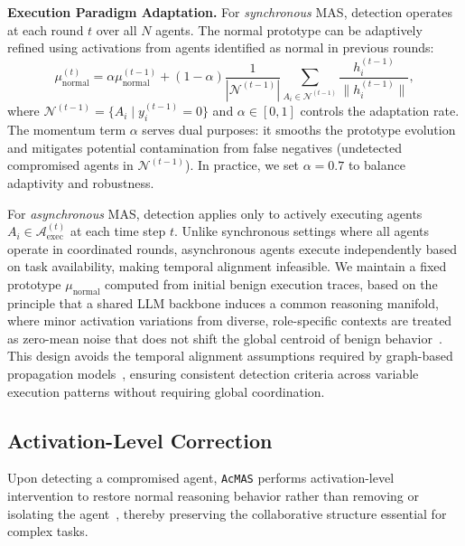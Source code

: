 \documentclass{article}
\newcommand{\app}{\texttt{AcMAS}}
\theoremstyle{plain}
\theoremstyle{definition}
\theoremstyle{remark}
\begin{document}
\noindent\textbf{Execution Paradigm Adaptation.}
For \textit{synchronous} MAS, detection operates at each round $t$ over all
$N$ agents. The normal prototype can be adaptively refined using activations
from agents identified as normal in previous rounds:
\begin{equation}
\mu_{\text{normal}}^{(t)} = \alpha \mu_{\text{normal}}^{(t-1)} +
(1-\alpha) \frac{1}{|\mathcal{N}^{(t-1)}|}
\sum_{A_i \in \mathcal{N}^{(t-1)}} \frac{h_i^{(t-1)}}{\|h_i^{(t-1)}\|},
\label{eq:adaptive_update}
\end{equation}
where $\mathcal{N}^{(t-1)} = \{A_i \mid y_i^{(t-1)} = 0\}$ and
$\alpha \in [0,1]$ controls the adaptation rate.
The momentum term $\alpha$ serves dual purposes: it smooths the prototype 
evolution and mitigates potential contamination from false negatives 
(undetected compromised agents in $\mathcal{N}^{(t-1)}$).
In practice, we set $\alpha = 0.7$ to balance adaptivity and robustness.

For \textit{asynchronous} MAS, detection applies only to actively executing
agents $A_i \in \mathcal{A}_{\text{exec}}^{(t)}$ at each time step $t$.
Unlike synchronous settings where all agents operate in coordinated rounds, 
asynchronous agents execute independently based on task availability, making 
temporal alignment infeasible.
We maintain a fixed prototype $\mu_{\text{normal}}$ computed from initial 
benign execution traces, based on the principle that a shared LLM backbone 
induces a common reasoning manifold, where minor activation variations from 
diverse, role-specific contexts are treated as zero-mean noise that does not 
shift the global centroid of benign behavior~\cite{zhang2025controlling}.
This design avoids the temporal alignment assumptions required by graph-based 
propagation models~\cite{wang2025g}, ensuring consistent detection criteria 
across variable execution patterns without requiring global coordination. 

\subsection{Activation-Level Correction}

Upon detecting a compromised agent, \app{} performs 
activation-level intervention to restore normal reasoning behavior 
rather than removing or isolating the agent~\cite{wang2025g,miao2025blindguard}, 
thereby preserving the collaborative structure essential for complex tasks.
\end{document}
